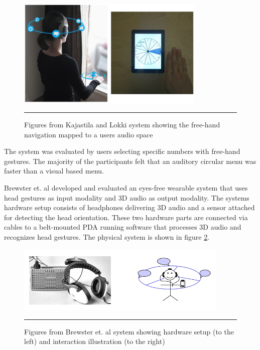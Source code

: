 \begin{figure}[htbp]
	\centering
		\includegraphics[width=0.8\textwidth,height=\textheight,keepaspectratio]{./Figures/kajastila-system.png}
		\rule{35em}{0.5pt}
	\caption[Kajastila system]{Figures from Kajastila and Lokki \cite{kajastila_interaction_2013} system showing the free-hand navigation mapped to a users audio space}
	\label{fig:kajastila}
\end{figure}

The system was evaluated by users selecting specific numbers with free-hand gestures. The majority of the participants felt that an auditory circular menu was faster than a visual based menu.


Brewster et. al \cite{brewster_multimodaleyes-freeinteraction_2003} developed and evaluated an eyes-free wearable system that uses head gestures as input modality and 3D audio as output modality. The systems hardware setup consists of headphones delivering 3D audio and a sensor attached for detecting the head orientation. These two hardware parts are connected via cables to a belt-mounted PDA running software that processes 3D audio and recognizes head gestures. The physical system is shown in figure \ref{fig:brewster}.

\begin{figure}[htbp]
	\centering
		\includegraphics[width=0.9\textwidth,height=\textheight,keepaspectratio]{./Figures/brewster-system.png}
		\rule{35em}{0.5pt}
	\caption[Brewster system]{Figures from Brewster et. al \cite{brewster_multimodaleyes-freeinteraction_2003} system showing hardware setup (to the left) and interaction illustration (to the right)}
	\label{fig:brewster}
\end{figure}

